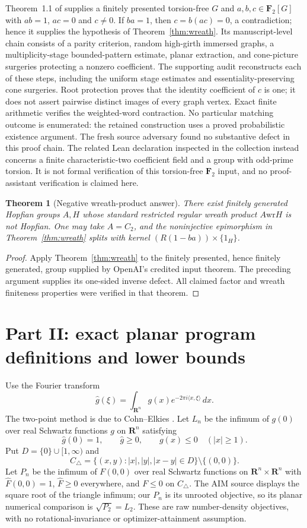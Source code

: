 \documentclass[11pt]{article}
\newtheorem{theorem}{Theorem}
\newcommand{\F}{\mathbf F}
\newcommand{\R}{\mathbf R}
\newcommand{\wrp}{\mathbin{\mathrm{wr}}}
\begin{document}
Theorem~1.1 of \cite{oai197} supplies a finitely presented torsion-free $G$ and $a,b,c\in\F_2[G]$ with $ab=1$, $ac=0$ and $c\ne0$. If $ba=1$, then $c=b(ac)=0$, a contradiction; hence it supplies the hypothesis of Theorem~\ref{thm:wreath}. Its manuscript-level chain consists of a parity criterion, random high-girth immersed graphs, a multiplicity-stage bounded-pattern estimate, planar extraction, and cone-picture surgeries protecting a nonzero coefficient. The supporting audit reconstructs each of these steps, including the uniform stage estimates and essentiality-preserving cone surgeries. Root protection proves that the identity coefficient of $c$ is one; it does not assert pairwise distinct images of every graph vertex. Exact finite arithmetic verifies the weighted-word contraction. No particular matching outcome is enumerated: the retained construction uses a proved probabilistic existence argument. The fresh source adversary found no substantive defect in this proof chain. The related Lean declaration inspected in the collection instead concerns a finite characteristic-two coefficient field and a group with odd-prime torsion. It is not formal verification of this torsion-free $\F_2$ input, and no proof-assistant verification is claimed here.

\begin{theorem}[Negative wreath-product answer]\label{thm:negative}
There exist finitely generated Hopfian groups $A,H$ whose standard restricted regular wreath product $A\wrp H$ is not Hopfian. One may take $A=C_2$, and the noninjective epimorphism in Theorem~\ref{thm:wreath} splits with kernel $(R(1-ba))\times\{1_H\}$.
\end{theorem}
\begin{proof}
Apply Theorem~\ref{thm:wreath} to the finitely presented, hence finitely generated, group supplied by OpenAI's credited input theorem. The preceding argument supplies its one-sided inverse defect. All claimed factor and wreath finiteness properties were verified in that theorem.
\end{proof}

\section{Part II: exact planar program definitions and lower bounds}
Use the Fourier transform
\[
 \widehat g(\xi)=\int_{\R^n}g(x)e^{-2\pi i\langle x,\xi\rangle}\,dx.
\]
The two-point method is due to Cohn--Elkies \cite{ce}. Let $L_n$ be the infimum of $g(0)$ over real Schwartz functions $g$ on $\R^n$ satisfying
\[
 \widehat g(0)=1,\qquad \widehat g\ge0,\qquad
 g(x)\le0\quad (|x|\ge1).
\]
Put $D=\{0\}\cup[1,\infty)$ and
\[
 C_\triangle=\{(x,y): |x|,|y|,|x-y|\in D\}\setminus\{(0,0)\}.
\]
Let $P_n$ be the infimum of $F(0,0)$ over real Schwartz functions on $\R^n\times\R^n$ with $\widehat F(0,0)=1$, $\widehat F\ge0$ everywhere, and $F\le0$ on $C_\triangle$. The AIM source displays the square root of the triangle infimum; our $P_n$ is its unrooted objective, so its planar numerical comparison is $\sqrt{P_2}=L_2$. These are raw number-density objectives, with no rotational-invariance or optimizer-attainment assumption.
\end{document}

